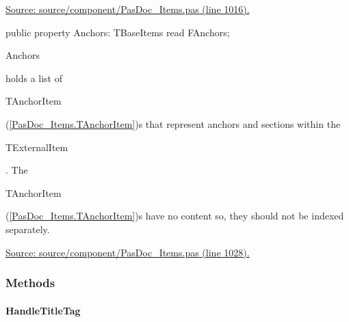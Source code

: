 \documentclass{report}
\newif\ifpdf
\begin{document}
\begin{list}{}
\begin{flushleft}
\ifpdf
\end{flushleft}
\fi


\par  \par
\href{https://github.com/pasdoc/pasdoc/blob/master/source/component/PasDoc_Items.pas#L1016}{Source: source/component/PasDoc{\_}Items.pas (line 1016).}\label{PasDoc_Items.TExternalItem-Anchors}
\item[\textbf{Anchors}\hfill]
\ifpdf
\begin{flushleft}
\fi
\begin{ttfamily}
public property Anchors: TBaseItems read FAnchors;\end{ttfamily}

\ifpdf
\end{flushleft}
\fi


\par \begin{ttfamily}Anchors\end{ttfamily} holds a list of \begin{ttfamily}TAnchorItem\end{ttfamily}(\ref{PasDoc_Items.TAnchorItem})s that represent anchors and sections within the \begin{ttfamily}TExternalItem\end{ttfamily}. The \begin{ttfamily}TAnchorItem\end{ttfamily}(\ref{PasDoc_Items.TAnchorItem})s have no content so, they should not be indexed separately.\par
\href{https://github.com/pasdoc/pasdoc/blob/master/source/component/PasDoc_Items.pas#L1028}{Source: source/component/PasDoc{\_}Items.pas (line 1028).}\end{list}
\subsubsection*{\large{\textbf{Methods}}\normalsize\hspace{1ex}\hfill}
\paragraph*{HandleTitleTag}\hspace*{\fill}
\end{document}
